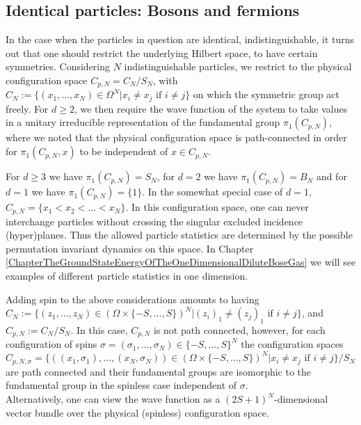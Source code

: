 	\subsection{Identical particles: Bosons and fermions}
		In the case when the particles in question are identical, \ie indistinguishable, it turns out that one should restrict the underlying Hilbert space, to have certain symmetries. Considering $ N $ indistinguishable particles, we restrict to the physical configuration space $ C_{p,N}=C_N/S_N $, with $ C_N:=\{(x_1,\ldots,x_N)\in \Omega^N \vert x_i\neq x_j \text{ if }i\neq j\} $ on which the symmetric group act freely. For $ d\geq 2 $, we then require the wave function of the system to take values in a unitary irreducible representation of the fundamental group $\pi_1(C_{p,N})$, where we noted that the physical configuration space is path-connected in order for $ \pi_1(C_{p,N},x) $ to be independent of $ x\in C_{p,N} $.
		\begin{remark}
			For $ d\geq 3 $ we have $\pi_1(C_{p,N})=S_N$, for $ d=2 $ we have $\pi_1(C_{p,N})=B_N$ and for $d=1$ we have $\pi_1(C_{p,N})=\{1\}$. In the somewhat special case of $d=1$, $C_{p,N}=\{x_1<x_2<\ldots<x_N\}$. In this configuration space, one can never interchange particles without crossing the singular excluded incidence (hyper)planes. Thus the allowed particle statistics are determined by the possible permutation invariant dynamics on this space. In Chapter \ref{ChapterTheGroundStateEnergyOfTheOneDimensionalDiluteBoseGas} we will see examples of different particle statistics in one dimension. 
		\end{remark}
		\begin{remark}
			Adding spin to the above considerations amounts to having $C_N:=\{(z_1,\ldots,z_N)\in \left(\Omega\times\{-S,\ldots,S\}\right)^N \vert (z_i)_1\neq (z_j)_1 \text{ if }i\neq j\}$, and $C_{p,N}:=C_N/S_N$. In this case, $C_{p,N}$ is not path connected, however, for each configuration of spins $ \sigma=(\sigma_1,\ldots,\sigma_N)\in\{-S,\ldots,S\}^N $ the configuration spaces $ C_{p,N,\sigma}=\{((x_1,\sigma_1),\ldots,(x_N,\sigma_N))\in \left(\Omega\times\{-S,\ldots,S\}\right)^N \vert x_i\neq x_j \text{ if }i\neq j\}/S_N $ are path connected and their fundamental groups are isomorphic to the fundamental group in the spinless case independent of $ \sigma $.\\
			Alternatively, one can view the wave function as a $ (2S+1)^N $-dimensional vector bundle over the physical (spinless) configuration space.
		\end{remark}
